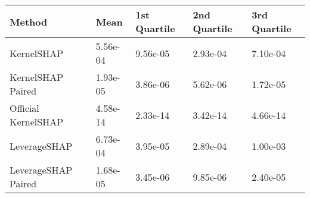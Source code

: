 \begin{tabular}{lllll}
  \toprule
  \textbf{Method} & \textbf{Mean} & \textbf{1st Quartile} & \textbf{2nd Quartile} & \textbf{3rd Quartile} \\ \midrule 
KernelSHAP & 5.56e-04 & 9.56e-05 & 2.93e-04 & 7.10e-04\\
KernelSHAP Paired & \cellcolor{bronze!60}1.93e-05 & \cellcolor{bronze!60}3.86e-06 & \cellcolor{silver!60}5.62e-06 & \cellcolor{silver!60}1.72e-05\\
Official KernelSHAP & \cellcolor{gold!60}4.58e-14 & \cellcolor{gold!60}2.33e-14 & \cellcolor{gold!60}3.42e-14 & \cellcolor{gold!60}4.66e-14\\
LeverageSHAP & 6.73e-04 & 3.95e-05 & 2.89e-04 & 1.00e-03\\
LeverageSHAP Paired & \cellcolor{silver!60}1.68e-05 & \cellcolor{silver!60}3.45e-06 & \cellcolor{bronze!60}9.85e-06 & \cellcolor{bronze!60}2.40e-05\\
\bottomrule
\end{tabular}
